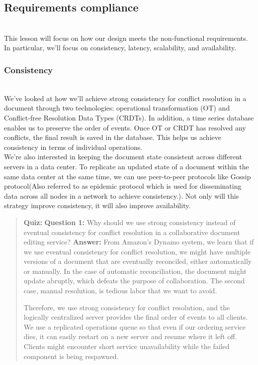 

\subsection{Requirements compliance}\label{0L6s9njl3vCo4TAgnPElM}
\\
This lesson will focus on how our design meets the non-functional requirements. In particular, we'll focus on consistency, latency, scalability, and availability.

\subsubsection{Consistency}\label{flWOWkjaAUxejHeTb9Bjf}
\\
We've looked at how we'll achieve strong consistency for conflict resolution in a document through two technologies: operational transformation (OT) and Conflict-free Resolution Data Types (CRDTs). In addition, a time series database enables us to preserve the order of events. Once OT or CRDT has resolved any conflicts, the final result is saved in the database. This helps us achieve consistency in terms of individual operations.
\\
We're also interested in keeping the document state consistent across different servers in a data center. To replicate an updated state of a document within the same data center at the same time, we can use peer-to-peer protocols like Gossip protocol(Also referred to as epidemic protocol which is used for disseminating data across all nodes in a network to achieve consistency.). Not only will this strategy improve consistency, it will also improve availability.

\begin{quote}
\textbf{Quiz:}
\textbf{Question 1:} Why should we use strong consistency instead of eventual consistency for conflict resolution in a collaborative document editing service?
\textbf{Answer:} From Amazon's Dynamo system, we learn that if we use eventual consistency for conflict resolution, we might have multiple versions of a document that are eventually reconciled, either automatically or manually. In the case of automatic reconciliation, the document might update abruptly, which defeats the purpose of collaboration. The second case, manual resolution, is tedious labor that we want to avoid.

Therefore, we use strong consistency for conflict resolution, and the logically centralized server provides the final order of events to all clients. We use a replicated operations queue so that even if our ordering service dies, it can easily restart on a new server and resume where it left off. Clients might encounter short service unavailability while the failed component is being respawned.
\end{quote}

